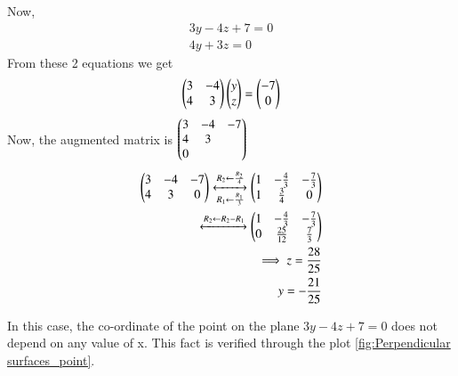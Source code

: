 \documentclass[journal,12pt,twocolumn]{IEEEtran}
\renewcommand\thesection{\arabic{section}}
\begin{document}
Now,
\begin{align}
3y-4z+7 =0\\
4y+3z=0
\end{align}
From these 2 equations we get 
\begin{align}
\begin{pmatrix}3&-4\\4&3\end{pmatrix} \begin{pmatrix}y\\z\end{pmatrix} = \begin{pmatrix}-7\\0\end{pmatrix}
\end{align}
Now, the augmented matrix is $\begin{pmatrix}3&-4&-7\\4&3\\0\end{pmatrix}$
\begin{align}
\begin{pmatrix}3&-4&-7\\4&3&0\end{pmatrix} \xleftrightarrow[R_1\leftarrow \frac{R_1}{3}]{R_2\leftarrow \frac{R_2}{4}}\begin{pmatrix}1&-\frac{4}{3}&-\frac{7}{3}\\1&\frac{3}{4}&0\end{pmatrix}\\
\xleftrightarrow[]{R_2\leftarrow R_2-R_1}\begin{pmatrix}1&-\frac{4}{3}&-\frac{7}{3}\\0&\frac{25}{12}&\frac{7}{3}\end{pmatrix}\\
\implies z= \frac{28}{25}\\
y= -\frac{21}{25}
\end{align}

In this case, the co-ordinate of the point on the plane $3y-4z+7 =0$ does not depend on any value of x. This fact is verified through the plot \ref{fig:Perpendicular surfaces_point}.
\end{document}
